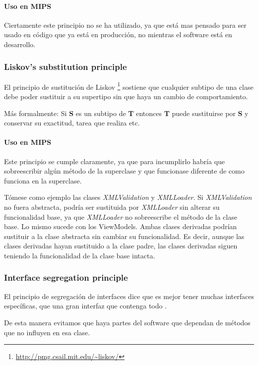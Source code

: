\paragraph{Uso en MIPS}
Ciertamente este principio no se ha utilizado, ya que est\'a mas pensado para ser usado en
c\'odigo que ya est\'a en producci\'on, no mientras el software est\'a en desarrollo.

\subsubsection{Liskov's substitution principle}
El principio de sustituci\'{o}n de Liskov \cite{SOLID:LSP} \footnote{\url{http://pmg.csail.mit.edu/~liskov/}} 
sostiene que cualquier subtipo de una clase
debe poder sustituir a su supertipo sin que haya un cambio de comportamiento.

M\'{a}s formalmente: Si \textbf{S} es un subtipo de \textbf{T} entonces \textbf{T} puede sustituirse por \textbf{S} y 
conservar su exactitud, tarea que realiza etc.

\paragraph{Uso en MIPS}
Este principio se cumple claramente, ya que para incumplirlo habr\'ia que sobreescribir alg\'un m\'etodo de la superclase
y que funcionase diferente de como funciona en la superclase. 

T\'omese como ejemplo las clases \emph{XMLValidation} y \emph{XMLLoader}.
Si \emph{XMLValidation} no fuera abstracta, podr\'ia ser sustituida por \emph{XMLLoader}
sin alterar su funcionalidad base, ya que \emph{XMLLoader} no sobreescribe el m\'etodo de la clase base. Lo mismo
sucede con los ViewModels. Ambas clases derivadas podr\'ian sustituir a la clase abstracta sin cambiar su funcionalidad. Es
decir, aunque las clases derivadas hayan sustituido a la clase padre, las clases derivadas siguen teniendo la funcionalidad
de la clase base intacta.

\subsubsection{Interface segregation principle}
El principio de segregaci\'{o}n de interfaces dice que es mejor tener muchas interfaces espec\'{i}ficas, 
que una gran interfaz que contenga todo \cite{SOLID:ISP}.

De esta manera evitamos que haya partes del software que dependan de m\'{e}todos que no influyen en esa clase.

